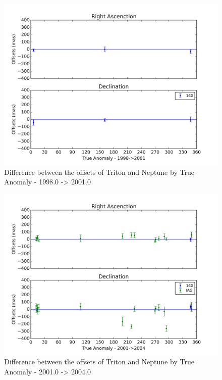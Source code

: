 \documentclass[12pt,a4paper]{report}
\begin{document}
\begin{figure}
\includegraphics[width=14.0cm]{Anom_TN_1998-2001.png} 
\caption{Difference between the offsets of Triton and Neptune by True Anomaly - 1998.0 -> 2001.0}
\label{Fig:triton-netuno-1998}
\end{figure}
\begin{figure}
\includegraphics[width=14.0cm]{Anom_TN_2001-2004.png} 
\caption{Difference between the offsets of Triton and Neptune by True Anomaly - 2001.0 -> 2004.0}
\label{Fig:triton-netuno-2001}
\end{figure}
\end{document}
